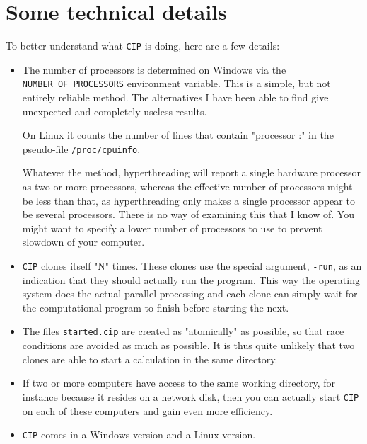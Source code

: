 \documentclass[onecolumn]{article}
\begin{document}
\section{Some technical details}
\label{technicalDetails}
To better understand what \verb+CIP+ is doing, here are a few details:
\begin{itemize}
\item
The number of processors is determined on Windows via the
\verb+NUMBER_OF_PROCESSORS+ environment variable. This is a simple,
but not entirely reliable method. The alternatives I have been able to
find give unexpected and completely useless results.

On Linux it counts the number of lines that contain "processor :" in
the pseudo-file \verb+/proc/cpuinfo+.

Whatever the method, hyperthreading will report a single hardware
processor as two or more processors, whereas the effective number of
processors might be less than that, as hyperthreading only makes a
single processor appear to be several processors. There is no way of
examining this that I know of. You might want to specify a lower
number of processors to use to prevent slowdown of your computer.

\item
\verb+CIP+ clones itself "N" times. These clones use the special
argument, \verb+-run+, as an indication that they should actually run
the program. This way the operating system does the actual parallel
processing and each clone can simply wait for the
computational program to finish before starting the next.

\item
The files \verb+started.cip+ are created as "atomically" as possible,
so that race conditions are avoided as much as possible. It is
thus quite unlikely that two clones are able to start a calculation in
the same directory.

\item
If two or more computers have access to the same working directory,
for instance because it resides on a network disk, then you can
actually start \verb+CIP+ on each of these computers and gain even
more efficiency.

\item
\verb+CIP+ comes in a Windows version and a Linux version.
\end{itemize}
\end{document}
